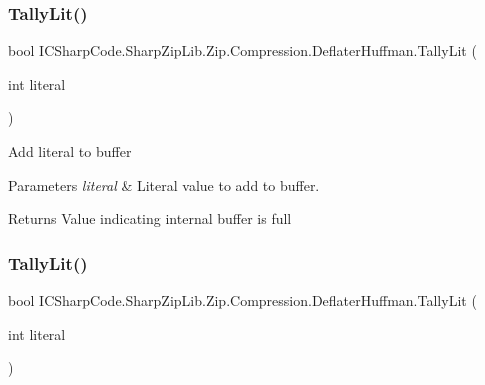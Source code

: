 \subsubsection{\texorpdfstring{Tally\+Lit()}{TallyLit()}\hspace{0.1cm}{\footnotesize\ttfamily [1/2]}}
{\footnotesize\ttfamily bool I\+C\+Sharp\+Code.\+Sharp\+Zip\+Lib.\+Zip.\+Compression.\+Deflater\+Huffman.\+Tally\+Lit (\begin{DoxyParamCaption}\item[{int}]{literal }\end{DoxyParamCaption})\hspace{0.3cm}{\ttfamily [inline]}}



Add literal to buffer 


\begin{DoxyParams}{Parameters}
{\em literal} & Literal value to add to buffer.\\
\hline
\end{DoxyParams}
\begin{DoxyReturn}{Returns}
Value indicating internal buffer is full
\end{DoxyReturn}
\mbox{\label{class_i_c_sharp_code_1_1_sharp_zip_lib_1_1_zip_1_1_compression_1_1_deflater_huffman_a444e33acca851e5312ef6d3596d93833}} 
\subsubsection{\texorpdfstring{Tally\+Lit()}{TallyLit()}\hspace{0.1cm}{\footnotesize\ttfamily [2/2]}}
{\footnotesize\ttfamily bool I\+C\+Sharp\+Code.\+Sharp\+Zip\+Lib.\+Zip.\+Compression.\+Deflater\+Huffman.\+Tally\+Lit (\begin{DoxyParamCaption}\item[{int}]{literal }\end{DoxyParamCaption})\hspace{0.3cm}{\ttfamily [inline]}}



